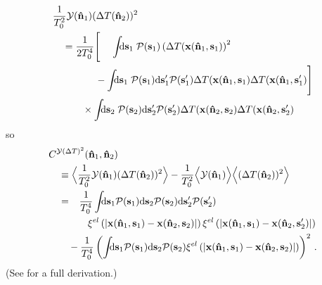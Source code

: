 \documentclass[fleqn,usenatbib]{mnras}
\begin{document}
    \begin{align}
        & \frac{1}{T_0^2}\Yd(\nhat_1)(\DeltaT(\nhat_2))^2
            \\
            &\quad =
             \frac{1}{2T_0^4}
                \Bigg[
                    \ \phantom{+} \int\!\!\!\dif{\mbf{s}_1}\;
                        \mcal{P}(\mbf{s}_1)
                        \left(\DeltaT(\mbf{x}(\nhat_1,\mbf{s}_1)\right)^2
                 \nonumber\\ &\qquad\qquad\
                    - \int\!\!\!\dif{\mbf{s}_1}\; \mcal{P}(\mbf{s}_1) \dif{\mbf{s}'_1} \mcal{P}(\mbf{s}'_1)
                        \DeltaT(\mbf{x}(\nhat_1,\mbf{s}_1)
                        \DeltaT(\mbf{x}(\nhat_1,\mbf{s}'_1)
                \Bigg] \nonumber
                \\ &\qquad\quad
                \times \int\!\!\!\dif{\mbf{s}_2} \; \mcal{P}(\mbf{s}_2) \dif{\mbf{s}'_2} \mcal{P}(\mbf{s}'_2)
                    \DeltaT(\mbf{x}(\nhat_2,\mbf{s}_2)
                    \DeltaT(\mbf{x}(\nhat_2,\mbf{s}'_2) \nonumber
    \end{align}
    so
    \begin{align}
    & C^{\Yd(\DeltaT)^2}(\mbf{\nhat}_1,\mbf{\nhat}_2) \nonumber
        \\
        &\quad \equiv
            \Big\langle \frac{1}{T_0^2}\Yd(\nhat_1)(\DeltaT(\nhat_2))^2 \Big\rangle
            - \frac{1}{T_0^2} \Big\langle\Yd(\nhat_1)\Big\rangle \Big\langle(\DeltaT(\nhat_2))^2 \Big\rangle
        \\
        &\quad =
            \phantom{+} \frac{1}{T_0^4}
            \int\!\!\!\dif{\mbf{s}_1} \mcal{P}(\mbf{s}_1) \dif{\mbf{s}_2} \mcal{P}(\mbf{s}_2) \dif{\mbf{s}'_2} \mcal{P}(\mbf{s}'_2)
            \\ &\qquad\qquad
            \xi^{el}\left(\norm{ \mbf{x}(\nhat_1,\mbf{s}_1) - \mbf{x}(\nhat_2,\mbf{s}_2) }\right)
            \xi^{el}\left(\norm{ \mbf{x}(\nhat_1,\mbf{s}_1) - \mbf{x}(\nhat_2,\mbf{s}'_2) }\right) \nonumber
            \\ &\qquad
            - \frac{1}{T_0^4}
              \left(
                \int\!\!\! \dif{\mbf{s}_1} \mcal{P}(\mbf{s}_1) \dif{\mbf{s}_2} \mcal{P}(\mbf{s}_2)
                    \xi^{el}\left(\norm{ \mbf{x}(\nhat_1,\mbf{s}_1) - \mbf{x}(\nhat_2,\mbf{s}_2) }\right)
              \right)^2 \,. \nonumber
    \end{align}
    (See  for a full derivation.)
\end{document}
